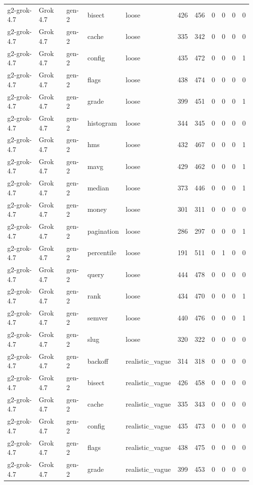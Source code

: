 \begin{tabular}{lllllllllll}
g2-grok-4.7 & Grok 4.7 & gen-2 & bisect & loose & 426 & 456 & 0 & 0 & 0 & 0 \\
g2-grok-4.7 & Grok 4.7 & gen-2 & cache & loose & 335 & 342 & 0 & 0 & 0 & 0 \\
g2-grok-4.7 & Grok 4.7 & gen-2 & config & loose & 435 & 472 & 0 & 0 & 0 & 1 \\
g2-grok-4.7 & Grok 4.7 & gen-2 & flags & loose & 438 & 474 & 0 & 0 & 0 & 0 \\
g2-grok-4.7 & Grok 4.7 & gen-2 & grade & loose & 399 & 451 & 0 & 0 & 0 & 1 \\
g2-grok-4.7 & Grok 4.7 & gen-2 & histogram & loose & 344 & 345 & 0 & 0 & 0 & 0 \\
g2-grok-4.7 & Grok 4.7 & gen-2 & hms & loose & 432 & 467 & 0 & 0 & 0 & 1 \\
g2-grok-4.7 & Grok 4.7 & gen-2 & mavg & loose & 429 & 462 & 0 & 0 & 0 & 1 \\
g2-grok-4.7 & Grok 4.7 & gen-2 & median & loose & 373 & 446 & 0 & 0 & 0 & 1 \\
g2-grok-4.7 & Grok 4.7 & gen-2 & money & loose & 301 & 311 & 0 & 0 & 0 & 0 \\
g2-grok-4.7 & Grok 4.7 & gen-2 & pagination & loose & 286 & 297 & 0 & 0 & 0 & 1 \\
g2-grok-4.7 & Grok 4.7 & gen-2 & percentile & loose & 191 & 511 & 0 & 1 & 0 & 0 \\
g2-grok-4.7 & Grok 4.7 & gen-2 & query & loose & 444 & 478 & 0 & 0 & 0 & 0 \\
g2-grok-4.7 & Grok 4.7 & gen-2 & rank & loose & 434 & 470 & 0 & 0 & 0 & 1 \\
g2-grok-4.7 & Grok 4.7 & gen-2 & semver & loose & 440 & 476 & 0 & 0 & 0 & 1 \\
g2-grok-4.7 & Grok 4.7 & gen-2 & slug & loose & 320 & 322 & 0 & 0 & 0 & 0 \\
g2-grok-4.7 & Grok 4.7 & gen-2 & backoff & realistic\_vague & 314 & 318 & 0 & 0 & 0 & 0 \\
g2-grok-4.7 & Grok 4.7 & gen-2 & bisect & realistic\_vague & 426 & 458 & 0 & 0 & 0 & 0 \\
g2-grok-4.7 & Grok 4.7 & gen-2 & cache & realistic\_vague & 335 & 343 & 0 & 0 & 0 & 0 \\
g2-grok-4.7 & Grok 4.7 & gen-2 & config & realistic\_vague & 435 & 473 & 0 & 0 & 0 & 0 \\
g2-grok-4.7 & Grok 4.7 & gen-2 & flags & realistic\_vague & 438 & 475 & 0 & 0 & 0 & 0 \\
g2-grok-4.7 & Grok 4.7 & gen-2 & grade & realistic\_vague & 399 & 453 & 0 & 0 & 0 & 0 \\

\end{tabular}
